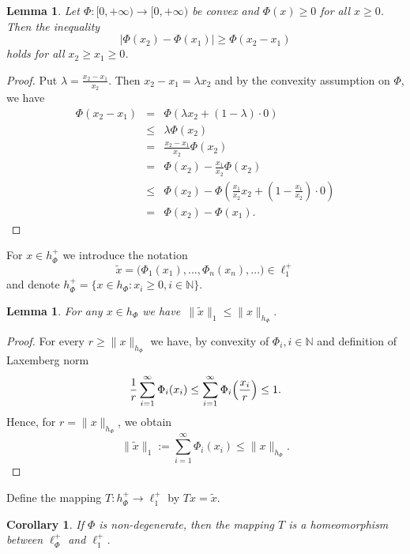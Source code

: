 \documentclass[12pt]{article}
\theoremstyle{thmstyleone}%
\newtheorem{lemma}[theorem]{Lemma}
\newtheorem{cor}[theorem]{Corollary}%
\theoremstyle{thmstyletwo}%
\theoremstyle{thmstylethree}%
\begin{document}
{{{\begin{lemma}\label{Lem-A}
	Let $\Phi:[0,+\infty)\to [0,+\infty)$ be convex and $\Phi(x)\ge 0$ for all $x\ge 0$. Then the inequality
	$$
	\left|\Phi(x_2)-\Phi(x_1)\right|\geq\Phi(x_2-x_1)
	$$
	holds for all $x_2\ge x_1 \ge 0$.
\end{lemma}

\begin{proof}
	Put $\lambda=\frac{x_2-x_1}{x_2}$. Then $x_2-x_1=\lambda x_2$ and by the convexity assumption on $\Phi$, we have
	$$
	\begin{array}{lll}
		\Phi(x_2-x_1)&=&\displaystyle\Phi(\lambda x_2+(1-\lambda)\cdot 0)\\
		&\leq& \lambda\Phi(x_2)\\
		&=&\frac{x_2-x_1}{x_2}\Phi(x_2)\\
		&=& \Phi(x_2)-\frac{x_1}{x_2}\Phi(x_2)\\
		&\leq&\displaystyle\Phi(x_2)-\Phi\left(\frac{x_1}{x_2}x_2+\left(1-\frac{x_1}{x_2}\right)\cdot 0\right)\\
		&=&\Phi(x_2)-\Phi(x_1).
	\end{array}
	$$ 
\end{proof}

For $x\in h_\Phi^+$ we introduce the notation
$$
\tilde x=\Big(\Phi_1(x_1),...,\Phi_n(x_n),...\Big)\in \ell_1^+
$$
and denote $h_\Phi^+=\{x\in h_\Phi : x_i\ge 0, i\in \mathbb{N}\}$.


\begin{lemma}\label{lemma:norms}
For any $x\in h_\Phi$ we have\ 
$
\|\tilde x\|_1\le \|x\|_{h_\Phi}.
$
\end{lemma}

\begin{proof}
For every $r\ge \|x\|_{h_\Phi}$ we have, by convexity of $\Phi_i, i\in \mathbb{N}$ and definition of Laxemberg norm
$$
{1\over r}\sum_{i=1}^\infty \Phi_i(x_i) \le \sum_{i=1}^\infty \Phi_i\Big ({x_i\over r}\Big ) \le 1.
$$
Hence, for  $r=\|x\|_{h_\Phi}$, we obtain
$$
\|\tilde x\|_1 := \sum_{i=1}^\infty \Phi_i(x_i) \le \|x\|_{h_\Phi}.
$$

\end{proof}


Define the mapping $T:h_\Phi^{+}\to\ell_1^{+}$ by $Tx=\widetilde{x}$.

\begin{cor}\label{cor-A}
If $\Phi$ is non-degenerate, then the mapping $T$ is a homeomorphism between  $\ell_\Phi^{+}$ and $\ell_1^{+}$. 

  
\end{cor}

}}}
\end{document}
